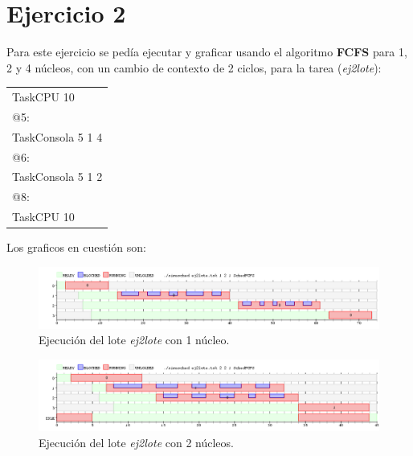 \section{Ejercicio 2}

Para este ejercicio se pedía ejecutar y graficar usando el algoritmo \textbf{FCFS} para 1, 2 y 4 núcleos, con un cambio de contexto de 2 ciclos, para la tarea (\emph{ej2lote}): 

\begin{center}
	\begin{tabular}{|l|}
		\hline
		TaskCPU 10			\\
		@5:					\\
		TaskConsola 5 1 4	\\
		@6:					\\
		TaskConsola 5 1 2	\\
		@8:					\\
		TaskCPU 10			\\
		\hline
	\end{tabular}
\end{center}

Los graficos en cuestión son:

\begin{figure}[!h]
	\begin{center}
		\includegraphics[width=500px]{imagenes/ej2_1.png}
		\caption{Ejecución del lote \emph{ej2lote} con 1 núcleo.}
		\label{fig:grafico_ej2_1}
	\end{center}
\end{figure}

\begin{figure}[!h]
	\begin{center}
		\includegraphics[width=500px]{imagenes/ej2_2.png}
		\caption{Ejecución del lote \emph{ej2lote} con 2 núcleos.}
		\label{fig:grafico_ej2_2}
	\end{center}
\end{figure}

